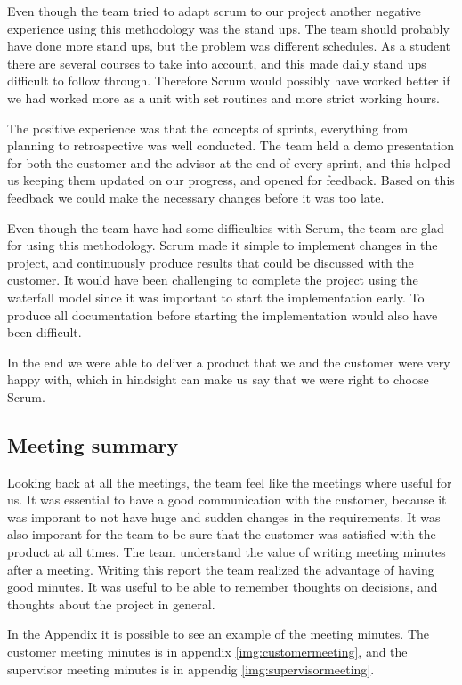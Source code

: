 Even though the team tried to adapt scrum to our project another negative experience using this methodology was the stand ups. The team should probably have done more stand ups, but the problem was different schedules. As a student there are several courses to take into account, and this made daily stand ups difficult to follow through. Therefore Scrum would possibly have worked better if we had worked more as a unit with set routines and more strict working hours.

The positive experience was that the concepts of sprints, everything from planning to retrospective was well conducted. The team held a demo presentation for both the customer and the advisor at the end of every sprint, and this helped us keeping them updated on our progress, and opened for feedback. Based on this feedback we could make the necessary changes before it was too late.

Even though the team have had some difficulties with Scrum, the team are glad for using this methodology. Scrum made it simple to implement changes in the project, and continuously produce results that could  be discussed with the customer. It would have been challenging to complete the project using the waterfall model since it was important to start the implementation early. To produce all documentation before starting the implementation would also have been difficult. 

In the end we were able to deliver a product that we and the customer were very happy with, which in hindsight can make us say that we were right to choose Scrum.

\subsection{Meeting summary}
Looking back at all the meetings, the team feel like the meetings where useful for us. It was essential to have a good communication with the customer, because it was imporant to not have huge and sudden changes in the requirements. It was also imporant for the team to be sure that the customer was satisfied with the product at all times. The team understand the value of writing meeting minutes after a meeting. Writing this report the team realized the advantage of having good minutes. It was useful to be able to remember thoughts on decisions, and thoughts about the project in general.

In the Appendix it is possible to see an example of the meeting minutes. The customer meeting minutes is in appendix \ref{img:customermeeting}, and the supervisor meeting minutes is in appendig \ref{img:supervisormeeting}. 
